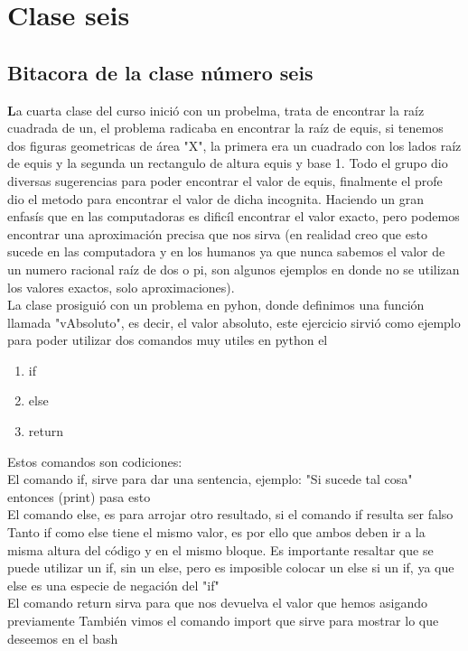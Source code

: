 \documentclass{book}
\begin{document}
\chapter{Clase seis}
\section{Bitacora de la clase número seis}

\textbf La cuarta clase del curso inició con un probelma, trata de encontrar la raíz cuadrada de un, el problema radicaba en encontrar la raíz de equis, si tenemos dos  figuras geometricas de área "X", la primera era un cuadrado con los lados raíz de equis y la segunda un rectangulo de altura equis y base 1. Todo el grupo dio diversas sugerencias para poder encontrar el valor de equis, finalmente el profe dio el metodo para encontrar el valor de dicha incognita. Haciendo un gran enfasís que en las computadoras es dificíl encontrar el valor exacto, pero podemos encontrar una aproximación precisa que nos sirva (en realidad creo que esto sucede en las computadora y en los humanos ya que nunca sabemos el valor de un numero racional raíz de dos o pi, son algunos ejemplos en donde no se utilizan los valores exactos, solo aproximaciones).\\
La clase prosiguió con un problema en pyhon, donde definimos una función llamada "vAbsoluto", es decir, el valor absoluto, este ejercicio sirvió como ejemplo para poder utilizar dos comandos muy utiles en python el
\begin{enumerate}
	\item if
	\item else
	\item return
\end{enumerate}
Estos comandos son codiciones:\\
El comando if, sirve para dar una sentencia, ejemplo: "Si sucede tal cosa" entonces (print) pasa esto\\
El comando else, es para arrojar otro resultado, si el comando if resulta ser falso\\
Tanto if como else tiene el mismo valor, es por ello que ambos deben ir a la misma altura del código y en el mismo bloque. Es importante resaltar que se puede utilizar un if, sin un else, pero es imposible colocar un else si un if, ya que else es una especie de negación del "if"\\
El comando return sirva para que nos devuelva el valor que hemos asigando previamente
También vimos el comando import que sirve para mostrar lo que deseemos en el bash\\
\end{document}
